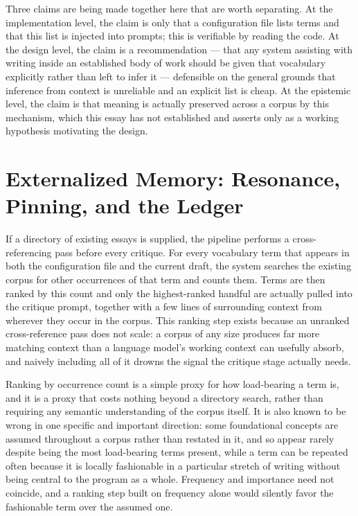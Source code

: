 \documentclass[11pt]{article}
\theoremstyle{definition}
\begin{document}
Three claims are being made together here that are worth separating.
At the implementation level, the claim is only that a configuration
file lists terms and that this list is injected into prompts; this is
verifiable by reading the code. At the design level, the claim is a
recommendation --- that any system assisting with writing inside an
established body of work should be given that vocabulary explicitly
rather than left to infer it --- defensible on the general grounds that
inference from context is unreliable and an explicit list is cheap. At
the epistemic level, the claim is that meaning is actually preserved
across a corpus by this mechanism, which this essay has not
established and asserts only as a working hypothesis motivating the
design.

\section{Externalized Memory: Resonance, Pinning, and the Ledger}
\label{sec:corpus}

If a directory of existing essays is supplied, the pipeline performs a
cross-referencing pass before every critique. For every vocabulary term
that appears in both the configuration file and the current draft, the
system searches the existing corpus for other occurrences of that term
and counts them. Terms are then ranked by this count and only the
highest-ranked handful are actually pulled into the critique prompt,
together with a few lines of surrounding context from wherever they
occur in the corpus. This ranking step exists because an unranked
cross-reference pass does not scale: a corpus of any size produces far
more matching context than a language model's working context can
usefully absorb, and naively including all of it drowns the signal the
critique stage actually needs.

Ranking by occurrence count is a simple proxy for how load-bearing a
term is, and it is a proxy that costs nothing beyond a directory
search, rather than requiring any semantic understanding of the corpus
itself. It is also known to be wrong in one specific and important
direction: some foundational concepts are assumed throughout a corpus
rather than restated in it, and so appear rarely despite being the most
load-bearing terms present, while a term can be repeated often because
it is locally fashionable in a particular stretch of writing without
being central to the program as a whole. Frequency and importance need
not coincide, and a ranking step built on frequency alone would
silently favor the fashionable term over the assumed one.
\end{document}
